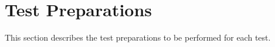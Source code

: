 
\chapter{Test Preparations}
\label{loc:TestPreparations}


This section describes the test preparations to be performed for each test.


\newcommand{\StsTestID}{Start Up Screen}%

\renewcommand{\StsTestID}{Test2}%

\renewcommand{\StsTestID}{Test3}%
